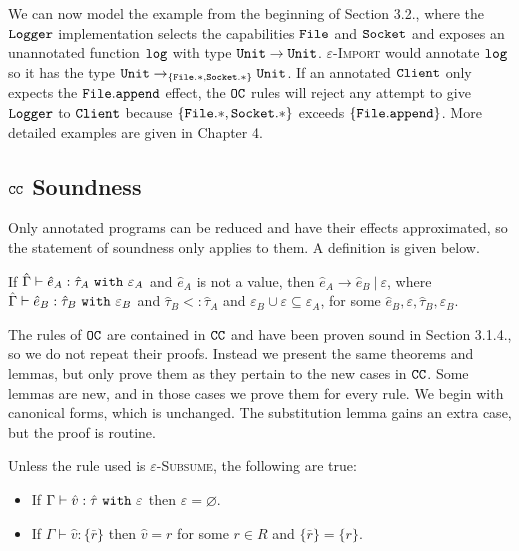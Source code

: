 We can now model the example from the beginning of Section 3.2., where the $\mathtt{Logger}$ implementation selects the capabilities $\mathtt{File}$ and $\mathtt{Socket}$ and exposes an unannotated function $\mathtt{log}$ with type $\mathtt{Unit} \rightarrow \mathtt{Unit}$. \textsc{$\varepsilon$-Import} would annotate $\mathtt{log}$ so it has the type $\mathtt{Unit} \rightarrow_{ \{ \mathtt{File.*, Socket.*} \} } \mathtt{Unit}$. If an annotated $\mathtt{Client}$ only expects the $\mathtt{File.append}$ effect, the $\mathtt{OC}$ rules will reject any attempt to give $\mathtt{Logger}$ to $\mathtt{Client}$ because $\mathtt{ \{ File.*, Socket.* \} }$ exceeds $ \mathtt{ \{File.append  \}}$. More detailed examples are given in Chapter 4.

\subsection{$\mathtt{CC}$ Soundness}

Only annotated programs can be reduced and have their effects approximated, so the statement of soundness only applies to them. A definition is given below.

\begin{theorem}[Soundness]
If $\hat \Gamma \vdash \hat e_A: \hat \tau_A~\mathtt{with}~ \varepsilon_A$ and $\hat e_A$ is not a value, then $\hat e_A \longrightarrow \hat e_B~|~\varepsilon$, where $\hat \Gamma \vdash \hat e_B: \hat \tau_B~\mathtt{with}~ \varepsilon_B$ and $\hat \tau_B <: \hat \tau_A$ and $\varepsilon_B \cup \varepsilon \subseteq \varepsilon_A$, for some $\hat e_B, \varepsilon, \hat \tau_B, \varepsilon_B$.
\end{theorem}

The rules of $\mathtt{OC}$ are contained in $\mathtt{CC}$ and have been proven sound in Section 3.1.4., so we do not repeat their proofs. Instead we present the same theorems and lemmas, but only prove them as they pertain to the new cases in $\mathtt{CC}$. Some lemmas are new, and in those cases we prove them for every rule. We begin with canonical forms, which is unchanged. The substitution lemma gains an extra case, but the proof is routine.

\begin{lemma}
Unless the rule used is \textsc{$\varepsilon$-Subsume}, the following are true:
\begin{itemize}
	\setlength\itemsep{-0.7em}
	\item If $ \Gamma \vdash \hat v: \hat \tau~\mathtt{with}~ \varepsilon$ then $\varepsilon = \varnothing$.
	\item If $ \Gamma \vdash \hat v: \{ \bar r \}$ then $\hat v = r$ for some $r \in R$ and $\{ \bar r \} = \{ r \}$.
\end{itemize}
\end{lemma}


